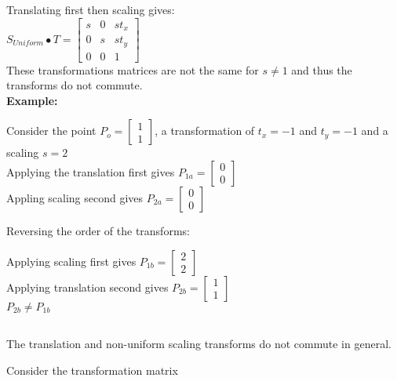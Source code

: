 \documentclass[a4paper,10pt]{scrartcl}
\begin{document}
Translating first then scaling gives: \\

$S_{Uniform} \bullet T = \begin{bmatrix}
		  s & 0 & st_x \\
		  0 & s & st_y \\
		  0 & 0 & 1
               \end{bmatrix}
$ \\ 

These transformations matrices are not the same for $s \neq 1$ and thus the transforms do not commute. \\ 

{\bfseries{Example:}}

Consider the point $P_o = \begin{bmatrix} 1 \\ 1 \end{bmatrix}$, a transformation of $t_x = -1$ and $t_y = -1$ and a scaling $s = 2$\\
Applying the translation first gives $P_{1a} = \begin{bmatrix} 0 \\ 0 \end{bmatrix}$ \\ 
Appling scaling second gives $P_{2a} = \begin{bmatrix} 0 \\ 0 \end{bmatrix}$

Reversing the order of the transforms:

Applying scaling first gives $P_{1b} = \begin{bmatrix} 2 \\ 2 \end{bmatrix}$ \\
Applying translation second gives  $P_{2b} = \begin{bmatrix} 1 \\ 1 \end{bmatrix}$ \\

$P_{2b} \neq P_{1b}$

\subsection{}


The translation and non-uniform scaling transforms do not commute in general.

Consider the transformation matrix \\
\end{document}
